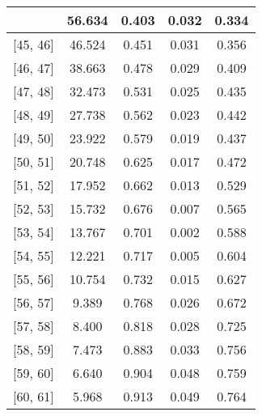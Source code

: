 \documentclass[12pt]{article}
\begin{document}
\begin{table}[]
\begin{tabular}{c|c|c|c|c|}
{\multicolumn{1}{|c|}{{[}44,  45{]}}  & 56.634 & 0.403 & 0.032 & 0.334 \\ \hline 
\multicolumn{1}{|c|}{{[}45,  46{]}}  & 46.524 & 0.451 & 0.031 & 0.356 \\ \hline 
\multicolumn{1}{|c|}{{[}46,  47{]}}  & 38.663 & 0.478 & 0.029 & 0.409 \\ \hline 
\multicolumn{1}{|c|}{{[}47,  48{]}}  & 32.473 & 0.531 & 0.025 & 0.435 \\ \hline 
\multicolumn{1}{|c|}{{[}48,  49{]}}  & 27.738 & 0.562 & 0.023 & 0.442 \\ \hline 
\multicolumn{1}{|c|}{{[}49,  50{]}}  & 23.922 & 0.579 & 0.019 & 0.437 \\ \hline 
\multicolumn{1}{|c|}{{[}50,  51{]}}  & 20.748 & 0.625 & 0.017 & 0.472 \\ \hline 
\multicolumn{1}{|c|}{{[}51,  52{]}}  & 17.952 & 0.662 & 0.013 & 0.529 \\ \hline 
\multicolumn{1}{|c|}{{[}52,  53{]}}  & 15.732 & 0.676 & 0.007 & 0.565 \\ \hline 
\multicolumn{1}{|c|}{{[}53,  54{]}}  & 13.767 & 0.701 & 0.002 & 0.588 \\ \hline 
\multicolumn{1}{|c|}{{[}54,  55{]}}  & 12.221 & 0.717 & 0.005 & 0.604 \\ \hline 
\multicolumn{1}{|c|}{{[}55,  56{]}}  & 10.754 & 0.732 & 0.015 & 0.627 \\ \hline 
\multicolumn{1}{|c|}{{[}56,  57{]}}  & 9.389 & 0.768 & 0.026 & 0.672 \\ \hline 
\multicolumn{1}{|c|}{{[}57,  58{]}}  & 8.400 & 0.818 & 0.028 & 0.725 \\ \hline 
\multicolumn{1}{|c|}{{[}58,  59{]}}  & 7.473 & 0.883 & 0.033 & 0.756 \\ \hline 
\multicolumn{1}{|c|}{{[}59,  60{]}}  & 6.640 & 0.904 & 0.048 & 0.759 \\ \hline 
\multicolumn{1}{|c|}{{[}60,  61{]}}  & 5.968 & 0.913 & 0.049 & 0.764 \\ \hline 
\end{tabular}
\end{table}
\end{document}
